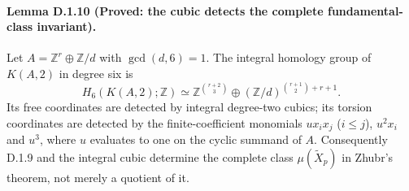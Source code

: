 \paragraph{Lemma D.1.10 (Proved: the cubic detects the complete fundamental-class invariant).}
Let $A=\mathbb Z^r\oplus\mathbb Z/d$ with $\gcd(d,6)=1$.
The integral homology group of $K(A,2)$ in degree six is
\[
 H_6(K(A,2);\mathbb Z)\simeq
 \mathbb Z^{\binom{r+2}{3}}\oplus
 (\mathbb Z/d)^{\binom{r+1}{2}+r+1}.
\]
Its free coordinates are detected by integral degree-two cubics;
its torsion coordinates are detected by the finite-coefficient
monomials $u x_i x_j$ ($i\leq j$), $u^2x_i$ and $u^3$, where
$u$ evaluates to one on the cyclic summand of $A$. Consequently
D.1.9 and the integral cubic determine the complete class
$\mu(\widetilde X_p)$ in Zhubr's theorem, not merely a quotient of it.
